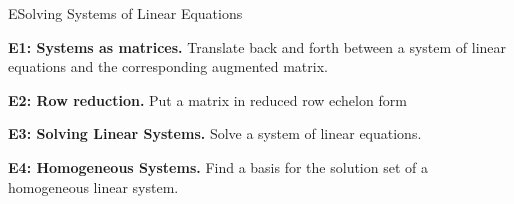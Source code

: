 
\begin{module}{E}{Solving Systems of Linear Equations}

\begin{moduleStandards}
  \item \textbf{E1: Systems as matrices.}
        Translate back and forth between a system of linear equations and
        the corresponding augmented matrix.
  \item \textbf{E2: Row reduction.}
        Put a matrix in reduced row echelon form
  \item \textbf{E3: Solving Linear Systems.}
        Solve a system of linear equations.
  \item \textbf{E4: Homogeneous Systems.}
        Find a basis for the solution set of a homogeneous linear system.
\end{moduleStandards}







\end{module}
